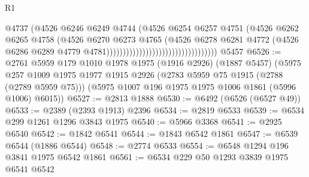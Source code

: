 \begin{lexlean}{R1}
\begin{coremodule}
                                                            @4737
                                                            (@4526
                                                              @6246
                                                              @6249
                                                              @4744
                                                              (@4526
                                                                @6254
                                                                @6257
                                                                @4751
                                                                (@4526
                                                                  @6262
                                                                  @6265
                                                                  @4758
                                                                  (@4526
                                                                    @6270
                                                                    @6273
                                                                    @4765
                                                                    (@4526
                                                                      @6278
                                                                      @6281
                                                                      @4772
                                                                      (@4526
                                                                        @6286
                                                                        @6289
                                                                        @4779
                                                                        @4781))))))))))))))))))))))))))))))))))
    @5457
@6526 := @2761
    @5959
    @179
    @1010
    @1978
    @1975
    (@1916 @2926)
    (@1887 @5457)
    (@5975
      @257
      @1009
      @1975
      @1977
      @1915
      @2926
      (@2783 @5959 @75 @1915 (@2788 (@2789 @5959 @75)))
      (@5975 @1007 @196 @1975 @1975 @1006 @1861 (@5996 @1006) @6015))
@6527 := @2813 @1888
@6530 := @6492 (@6526 (@6527 @49))
@6533 := @2389 (@2393 @1913) @2396
@6534 := @2819 @6533
@6539 := @6534 @299 @1261 @1296 @3843 @1975
@6540 := @5966 @3368
@6541 := @2925 @6540
@6542 := @1842 @6541
@6544 := @1843 @6542 @1861
@6547 := @6539 @6544 (@1886 @6544)
@6548 := @2774 @6533
@6554 := @6548 @1294 @196 @3841 @1975 @6542 @1861
@6561 := @6534 @229 @50 @1293 @3839 @1975 @6541 @6542

\end{coremodule}
\end{lexlean}
